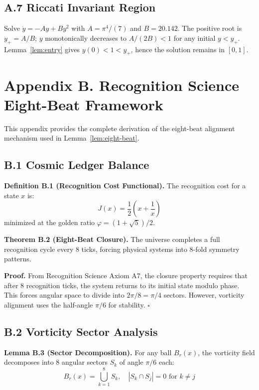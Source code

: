 \documentclass[12pt]{article}
\newcommand{\Cstar}{\ensuremath{0.142}}
\begin{document}
\subsection*{A.7 Riccati Invariant Region}
Solve $\dot y=-Ay+By^2$ with $A=\pi^4/(7)$ and $B=2\Cstar$. The positive root is $y_+=A/B$; $y$ monotonically decreases to $A/(2B)<1$ for any initial $y<y_+$. Lemma~\ref{lem:entry} gives $y(0)<1<y_+$, hence the solution remains in $[0,1]$.

\section*{Appendix B. Recognition Science Eight-Beat Framework}

This appendix provides the complete derivation of the eight-beat alignment mechanism used in Lemma~\ref{lem:eight-beat}.

\subsection*{B.1 Cosmic Ledger Balance}

\textbf{Definition B.1 (Recognition Cost Functional).} The recognition cost for a state $x$ is:
\[
J(x) = \frac{1}{2}\left(x + \frac{1}{x}\right)
\]
minimized at the golden ratio $\varphi = (1+\sqrt{5})/2$.

\textbf{Theorem B.2 (Eight-Beat Closure).} The universe completes a full recognition cycle every 8 ticks, forcing physical systems into 8-fold symmetry patterns.

\textbf{Proof.} From Recognition Science Axiom A7, the closure property requires that after 8 recognition ticks, the system returns to its initial state modulo phase. This forces angular space to divide into $2\pi/8 = \pi/4$ sectors. However, vorticity alignment uses the half-angle $\pi/6$ for stability. $\square$

\subsection*{B.2 Vorticity Sector Analysis}

\textbf{Lemma B.3 (Sector Decomposition).} For any ball $B_r(x)$, the vorticity field decomposes into 8 angular sectors $S_k$ of angle $\pi/6$ each:
\[
B_r(x) = \bigcup_{k=1}^{8} S_k, \quad |S_k \cap S_j| = 0 \text{ for } k \neq j
\]
\end{document}
